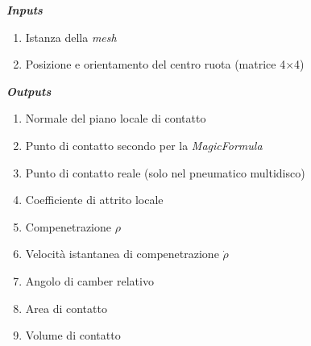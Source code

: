 \documentclass[xcolor=dvipsnames]{beamer} %
\begin{document}
\begin{frame}[fragile]
	\Large{\textbf{\textit{Inputs}}}
	\normalsize
	\begin{enumerate}
		\item Istanza della \textit{mesh}
		\item Posizione e orientamento del centro ruota (matrice 4$\times$4)
	\end{enumerate}
	\vspace{0.3cm}
	\Large{\textbf{\textit{Outputs}}}
	\normalsize
	\begin{enumerate}
		\item Normale del piano locale di contatto
		\item Punto di contatto secondo per la \textit{MagicFormula}
		\item Punto di contatto reale (solo nel pneumatico multidisco)
		\item Coefficiente di attrito locale
		\item Compenetrazione $\rho$
		\item Velocità istantanea di compenetrazione $\dot{\rho}$
		\item Angolo di camber relativo
		\item Area di contatto
		\item Volume di contatto
	\end{enumerate}
\end{frame}
\end{document}

